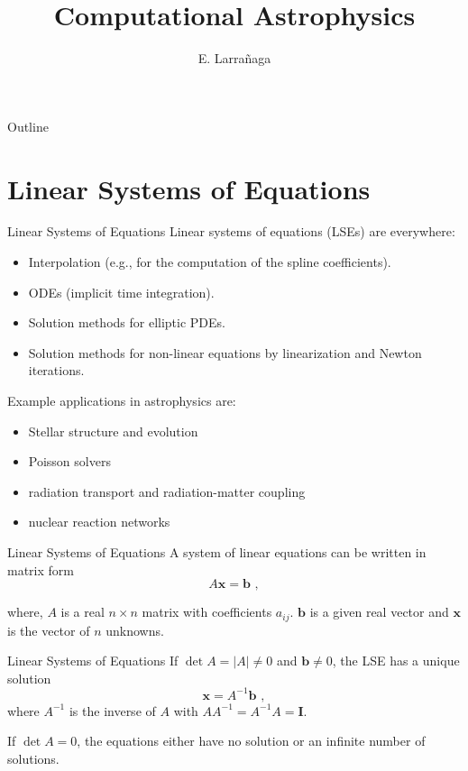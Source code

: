 \documentclass[11pt]{beamer}
\begin{document}
\begin{frame}
\title{Computational Astrophysics}
\author{E. Larrañaga}
\titlepage
\end{frame}

\begin{frame}{Outline}
\tableofcontents
\end{frame}

\section{Linear Systems of Equations}
\begin{frame}[fragile]{Linear Systems of Equations }
Linear systems of equations (LSEs) are everywhere:
\begin{itemize}
  \item Interpolation (e.g., for the computation of the spline
    coefficients).
  \item ODEs (implicit time integration).
  \item Solution methods for elliptic PDEs.
  \item Solution methods for non-linear equations by linearization
    and Newton iterations.
\end{itemize}

Example applications in astrophysics are: 
\begin{itemize}
\item Stellar structure and evolution
\item Poisson solvers
\item radiation transport and
radiation-matter coupling
\item nuclear reaction networks
\end{itemize}
\end{frame}


\begin{frame}[fragile]{Linear Systems of Equations }
A system of linear equations can be written in matrix form
\begin{equation}
A \mathbf{x} = \mathbf{b}\,\,,
\label{eq:lse}
\end{equation}

where, $A$ is a real $n\times n$ matrix with coefficients $a_{ij}$.
$\mathbf{b}$ is a given real vector and $\mathbf{x}$ is the vector of
$n$ unknowns.
\end{frame}

\begin{frame}[fragile]{Linear Systems of Equations}
If $\det{A} = |A| \ne 0$ and $\mathbf{b} \ne 0$, the  LSE has a unique solution
\begin{equation}
\mathbf{x} = A^{-1} \mathbf{b}\,\,,
\end{equation}
where $A^{-1}$ is the inverse of $A$ with $AA^{-1}=A^{-1}
A=\mathbf{I}$.  \\
\bigskip

If $\det{A} = 0$, the equations either
have no solution or an infinite number of solutions.
\end{frame}
\end{document}
